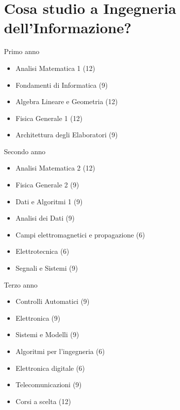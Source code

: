 \documentclass{beamer}
\begin{document}
	\section{Cosa studio a Ingegneria dell'Informazione?}
	\begin{frame}{Primo anno}
		\begin{itemize}
			\setlength\itemsep{1em}
			\item[ ] {\color{red}Analisi Matematica 1 (12)}
			\item[ ] {\color{blue}Fondamenti di Informatica (9)}
			\item[ ] {\color{red}Algebra Lineare e Geometria (12)}
			\item[ ] {\color{red}Fisica Generale 1 (12)}
			\item[ ] {\color{blue}Architettura degli Elaboratori (9)}
		\end{itemize}
	\end{frame}
	\begin{frame}{Secondo anno}
		\begin{itemize}
			\setlength\itemsep{1em}
			\item[ ] {\color{red}Analisi Matematica 2 (12)}
			\item[ ] {\color{red}Fisica Generale 2 (9)}
			\item[ ] {\color{blue}Dati e Algoritmi 1 (9)}
			\item[ ] {\color{blue}Analisi dei Dati (9)}
			\item[ ] {\color{blue}Campi elettromagnetici e propagazione (6)}
			\item[ ] {\color{blue}Elettrotecnica (6)}
			\item[ ] {\color{blue}Segnali e Sistemi (9)}
		\end{itemize}
	\end{frame}
	\begin{frame}{Terzo anno}
		\begin{itemize}
			\setlength\itemsep{1em}
			\item[ ] {\color{blue}Controlli Automatici (9)}
			\item[ ] {\color{blue}Elettronica (9)}
			\item[ ] {\color{blue}Sistemi e Modelli (9)}
			\item[ ] {\color{blue}Algoritmi per l'ingegneria (6)}
			\item[ ] {\color{blue}Elettronica digitale (6)}
			\item[ ] {\color{blue}Telecomunicazioni (9)}
			\item[ ] {\color{blue}Corsi a scelta (12)}
		\end{itemize}
	\end{frame}
\end{document}
